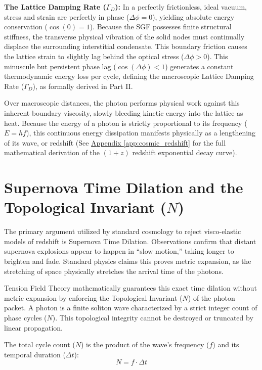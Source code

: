 \textbf{The Lattice Damping Rate ($\Gamma_D$):} In a perfectly frictionless, ideal vacuum, stress and strain are perfectly in phase ($\Delta\phi = 0$), yielding absolute energy conservation ($\cos(0) = 1$). Because the SGF possesses finite structural stiffness, the transverse physical vibration of the solid nodes must continually displace the surrounding interstitial condensate. This boundary friction causes the lattice strain to slightly lag behind the optical stress ($\Delta\phi > 0$). This minuscule but persistent phase lag ($\cos(\Delta\phi) < 1$) generates a constant thermodynamic energy loss per cycle, defining the macroscopic Lattice Damping Rate ($\Gamma_D$), as formally derived in Part II.

Over macroscopic distances, the photon performs physical work against this inherent boundary viscosity, slowly bleeding kinetic energy into the lattice as heat. Because the energy of a photon is strictly proportional to its frequency ($E=hf$), this continuous energy dissipation manifests physically as a lengthening of its wave, or redshift (See \hyperref[app:cosmic_redshift]{Appendix \ref*{app:cosmic_redshift}} for the full mathematical derivation of the $(1+z)$ redshift exponential decay curve).

\section{Supernova Time Dilation and the Topological Invariant ($N$)}
The primary argument utilized by standard cosmology to reject visco-elastic models of redshift is Supernova Time Dilation. Observations confirm that distant supernova explosions appear to happen in ``slow motion,'' taking longer to brighten and fade. Standard physics claims this proves metric expansion, as the stretching of space physically stretches the arrival time of the photons.

Tension Field Theory mathematically guarantees this exact time dilation without metric expansion by enforcing the Topological Invariant ($N$) of the photon packet. A photon is a finite soliton wave characterized by a strict integer count of phase cycles ($N$). This topological integrity cannot be destroyed or truncated by linear propagation.

The total cycle count ($N$) is the product of the wave's frequency ($f$) and its temporal duration ($\Delta t$):
\begin{equation}
    N = f \cdot \Delta t
\end{equation}

